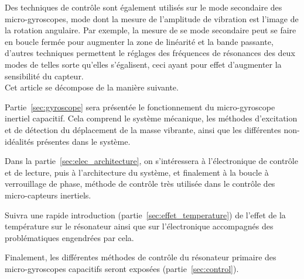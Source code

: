 Des techniques de contrôle sont également utilisés sur le mode secondaire des micro-gyroscopes, mode dont la mesure de l'amplitude de vibration est l'image de la rotation angulaire. Par exemple, la mesure de se mode secondaire peut se faire en boucle fermée pour augmenter la zone de linéarité et la bande passante, d'autres techniques permettent le réglages des fréquences de résonances des deux modes de telles sorte qu'elles s'égalisent, ceci ayant pour effet d'augmenter la sensibilité du capteur.\\


Cet article se décompose de la manière suivante.

Partie~\ref{sec:gyroscope} sera présentée le fonctionnement du micro-gyroscope inertiel capacitif. Cela comprend le système mécanique, les méthodes d'excitation et de détection du déplacement de la masse vibrante, ainsi que les différentes non-idéalités présentes dans le système.

Dans la partie~\ref{sec:elec_architecture}, on s'intéressera à l'électronique de contrôle et de lecture, puis à l'architecture du système, et finalement à la boucle à verrouillage de phase, méthode de contrôle très utilisée dans le contrôle des micro-capteurs inertiels.

Suivra une rapide introduction (partie~\ref{sec:effet_temperature}) de l'effet de la température sur le résonateur ainsi que sur l'électronique accompagnés des problématiques engendrées par cela.

Finalement, les différentes méthodes de contrôle du résonateur primaire des micro-gyroscopes capacitifs seront exposées (partie~\ref{sec:control}).

